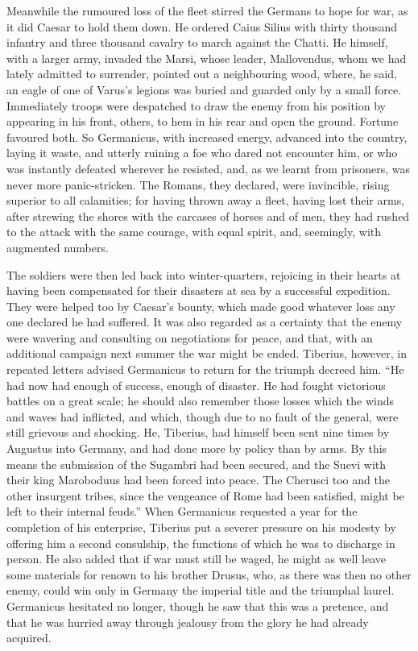 
Meanwhile the rumoured loss of the fleet stirred the Germans to hope for war, as it did Caesar to hold them down. He ordered Caius Silius with thirty thousand infantry and three thousand cavalry to march against the Chatti. He himself, with a larger army, invaded the Marsi, whose leader, Mallovendus, whom we had lately admitted to surrender, pointed out a neighbouring wood, where, he said, an eagle of one of Varus's legions was buried and guarded only by a small force. Immediately troops were despatched to draw the enemy from his position by appearing in his front, others, to hem in his rear and open the ground. Fortune favoured both. So Germanicus, with increased energy, advanced into the country, laying it waste, and utterly ruining a foe who dared not encounter him, or who was instantly defeated wherever he resisted, and, as we learnt from prisoners, was never more panic-stricken. The Romans, they declared, were invincible, rising superior to all calamities; for having thrown away a fleet, having lost their arms, after strewing the shores with the carcases of horses and of men, they had rushed to the attack with the same courage, with equal spirit, and, seemingly, with augmented numbers.


The soldiers were then led back into winter-quarters, rejoicing in their hearts at having been compensated for their disasters at sea by a successful expedition. They were helped too by Caesar's bounty, which made good whatever loss any one declared he had suffered. It was also regarded as a certainty that the enemy were wavering and consulting on negotiations for peace, and that, with an additional campaign next summer the war might be ended. Tiberius, however, in repeated letters advised Germanicus to return for the triumph decreed him. ``He had now had enough of success, enough of disaster. He had fought victorious battles on a great scale; he should also remember those losses which the winds and waves had inflicted, and which, though due to no fault of the general, were still grievous and shocking. He, Tiberius, had himself been sent nine times by Augustus into Germany, and had done more by policy than by arms. By this means the submission of the Sugambri had been secured, and the Suevi with their king Maroboduus had been forced into peace. The Cherusci too and the other insurgent tribes, since the vengeance of Rome had been satisfied, might be left to their internal feuds.'' When Germanicus requested a year for the completion of his enterprise, Tiberius put a severer pressure on his modesty by offering him a second consulship, the functions of which he was to discharge in person. He also added that if war must still be waged, he might as well leave some materials for renown to his brother Drusus, who, as there was then no other enemy, could win only in Germany the imperial title and the triumphal laurel. Germanicus hesitated no longer, though he saw that this was a pretence, and that he was hurried away through jealousy from the glory he had already acquired.

